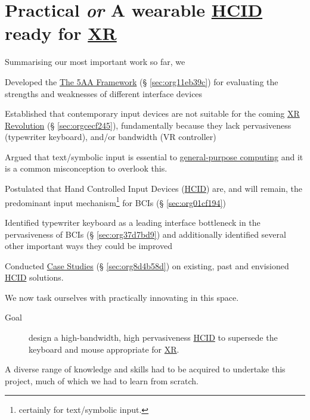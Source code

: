 \documentclass[logo,bsc,singlespacing,parskip]{infthesis}
\begin{document}
\part{Practical \emph{or} A wearable \hyperref[org917851e]{HCID} ready for \hyperref[org53dbe83]{XR}}
\label{sec:orgc716832}
Summarising our most important work so far, we
\begin{enumerate*}[label={\arabic*)}, itemjoin={, \,}, itemjoin*={, and \,}]
\item Developed the \hyperref[sec:org11eb39c]{The 5AA Framework} (§ \ref{sec:org11eb39c}) for evaluating the strengths and weaknesses of different interface devices
\item Established that contemporary input devices are not suitable for the coming \hyperref[sec:orgcecf245]{XR Revolution} (§ \ref{sec:orgcecf245}), fundamentally because they lack pervasiveness (typewriter keyboard), and/or bandwidth (VR controller)
\item Argued that text/symbolic input is essential to \hyperref[org2840555]{general-purpose computing} and it is a common misconception to overlook this.
\item Postulated that Hand Controlled Input Devices (\hyperref[org917851e]{HCID}) are, and will remain, the predominant input mechanism\footnote{certainly for text/symbolic input.} for BCIs (§ \ref{sec:org01cf194})
\item Identified typewriter keyboard as a leading interface bottleneck in the pervasiveness of BCIs (§ \ref{sec:org37d7bd9}) and additionally identified several other important ways they could be improved
\item Conducted \hyperref[sec:org8d4b58d]{Case Studies} (§ \ref{sec:org8d4b58d}) on existing, past and envisioned \hyperref[org917851e]{HCID} solutions.
\end{enumerate*}
We now task ourselves with practically innovating in this space. \medskip

\begin{mdframed}
\begin{description}
\item[{Goal}] design a high-bandwidth, high pervasiveness \hyperref[org917851e]{HCID} to supersede the keyboard and mouse appropriate for \hyperref[org53dbe83]{XR}.
\end{description}
\end{mdframed}

A diverse range of knowledge and skills had to be acquired to undertake this project, much of which we had to learn from scratch.
\end{document}
